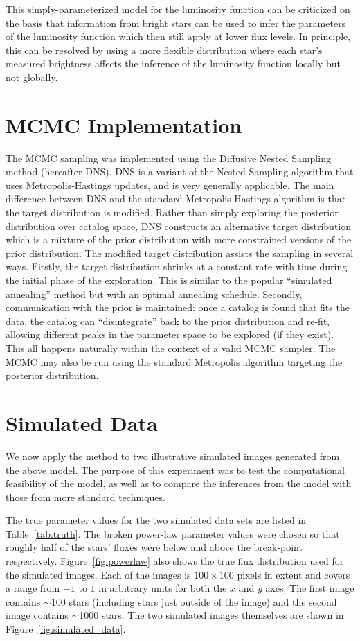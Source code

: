 \documentclass[manuscript]{aastex}
\begin{document}
This simply-parameterized model for the luminosity function can be criticized
on the basis that information from bright stars can be used to infer the
parameters of the luminosity function which then still apply at lower flux
levels. In principle, this can be resolved by using a more flexible distribution
\citep[e.g.][]{2008ApJ...682..874K} where each star's measured brightness
affects the inference of the luminosity function locally but not globally.

\section{MCMC Implementation}
The MCMC sampling was implemented using the Diffusive Nested Sampling
\citep{dnest} method (hereafter DNS). DNS is a variant of the
Nested Sampling \citep{skilling} algorithm that uses Metropolis-Hastings
updates, and
is very generally applicable. The main difference between DNS and the standard
Metropolis-Hastings algorithm is that the target distribution is modified.
Rather than simply exploring the posterior distribution over catalog space,
DNS constructs an alternative target distribution which is a mixture of the
prior distribution with more constrained versions of the prior distribution.
The modified target distribution assists the sampling in several ways.
Firstly, the target distribution shrinks at a constant rate with time during the
initial phase of the exploration. This is similar to the popular ``simulated
annealing'' method but with an optimal annealing schedule. Secondly,
communication with the prior is maintained: once a catalog is found that
fits the data, the catalog can ``disintegrate'' back to the prior distribution
and re-fit, allowing different peaks in the parameter space to be explored
(if they exist). This all happens naturally within the context of a valid
MCMC sampler. The MCMC may also be run using the standard Metropolis algorithm
targeting the posterior distribution.

\section{Simulated Data}\label{sec:simulated_data}
We now apply the method to two illustrative simulated images generated from
the above model. The purpose of this experiment was to test the computational
feasibility of the model, as well as to compare the inferences from the model
with those from more standard techniques.

The true parameter values for the two simulated data sets are listed in
Table~\ref{tab:truth}. The broken power-law parameter values were chosen so that
roughly half of the stars' fluxes were below and above the break-point
respectively. Figure~\ref{fig:powerlaw} also shows the true flux distribution
used for the simulated images. Each of the images
is $100 \times 100$ pixels in extent and covers a range from $-1$ to $1$ in
arbitrary units for both the $x$ and $y$ axes. The first image contains
$\sim$100 stars (including stars just outside of the image) and the second
image contains $\sim$1000 stars. The two simulated images themselves
are shown in Figure~\ref{fig:simulated_data}.
\end{document}
